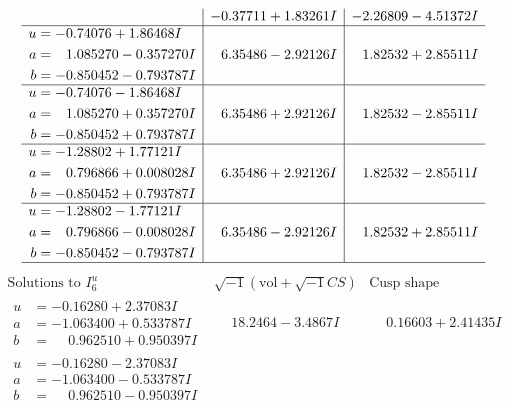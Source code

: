 \documentclass[1p]{elsarticle_modified}
\theoremstyle{definition}
\newcommand{\I}{\sqrt{-1}}
\begin{document}
$$\begin{array}{c|c|c}
 & -0.37711 + 1.83261 I & -2.26809 - 4.51372 I \\ \hline\begin{aligned}
u &= -0.74076 + 1.86468 I \\
a &= \phantom{-}1.085270 - 0.357270 I \\
b &= -0.850452 - 0.793787 I\end{aligned}
 & \phantom{-}6.35486 - 2.92126 I & \phantom{-}1.82532 + 2.85511 I \\ \hline\begin{aligned}
u &= -0.74076 - 1.86468 I \\
a &= \phantom{-}1.085270 + 0.357270 I \\
b &= -0.850452 + 0.793787 I\end{aligned}
 & \phantom{-}6.35486 + 2.92126 I & \phantom{-}1.82532 - 2.85511 I \\ \hline\begin{aligned}
u &= -1.28802 + 1.77121 I \\
a &= \phantom{-}0.796866 + 0.008028 I \\
b &= -0.850452 + 0.793787 I\end{aligned}
 & \phantom{-}6.35486 + 2.92126 I & \phantom{-}1.82532 - 2.85511 I \\ \hline\begin{aligned}
u &= -1.28802 - 1.77121 I \\
a &= \phantom{-}0.796866 - 0.008028 I \\
b &= -0.850452 - 0.793787 I\end{aligned}
 & \phantom{-}6.35486 - 2.92126 I & \phantom{-}1.82532 + 2.85511 I\\
 \hline 
 \end{array}$$\newpage$$\begin{array}{c|c|c}  
\text{Solutions to }I^u_{6}& \I (\text{vol} + \sqrt{-1}CS) & \text{Cusp shape}\\
 \hline 
\begin{aligned}
u &= -0.16280 + 2.37083 I \\
a &= -1.063400 + 0.533787 I \\
b &= \phantom{-}0.962510 + 0.950397 I\end{aligned}
 & \phantom{-}18.2464 - 3.4867 I & \phantom{-}0.16603 + 2.41435 I \\ \hline\begin{aligned}
u &= -0.16280 - 2.37083 I \\
a &= -1.063400 - 0.533787 I \\
b &= \phantom{-}0.962510 - 0.950397 I\end{aligned}

\end{array}$$
\end{document}
